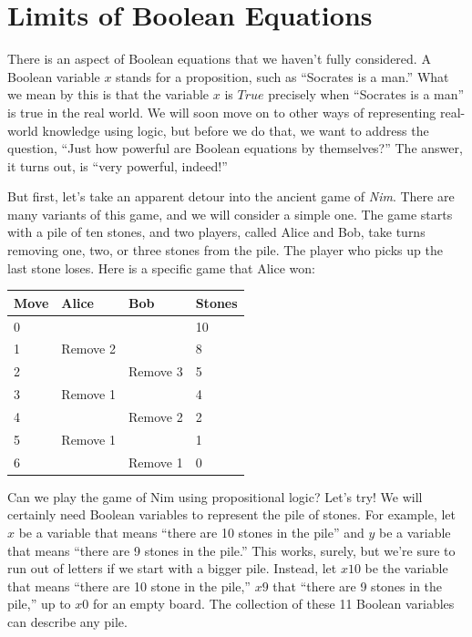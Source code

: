 {{\section{Limits of Boolean Equations}

There is an aspect of Boolean equations that we haven't fully considered. A Boolean variable $x$ stands for a proposition, 
such as ``Socrates is a man.'' What we mean by this is that the variable $x$ is $True$ precisely when ``Socrates is a man'' 
is true in the real world. We will soon move on to other ways of representing real-world knowledge using logic, but before 
we do that, we want to address the question, ``Just how powerful are Boolean equations by themselves?'' The answer, it 
turns out, is ``very powerful, indeed!''

But first, let's take an apparent detour into the ancient game of \emph{Nim}. There are many variants of this game, and we 
will consider a simple one. The game starts with a pile of ten stones, and two players, called Alice and Bob, take turns 
removing one, two, or three stones from the pile. The player who picks up the last stone loses. Here is a specific game 
that Alice won:

\begin{flushleft}
\begin{tabular}{l|l|l|l}
Move & Alice     & Bob      & Stones \\
\hline
0    &           &          & 10     \\
1    & Remove 2  &          & 8      \\
2    &           & Remove 3 & 5      \\
3    & Remove 1  &          & 4      \\
4    &           & Remove 2 & 2      \\
5    & Remove 1  &          & 1      \\
6    &           & Remove 1 & 0      \\
\end{tabular}
\end{flushleft}

Can we play the game of Nim using propositional logic? Let's try! We will certainly need Boolean variables to represent the 
pile of stones. For example, let $x$ be a variable that means ``there are 10 stones in the pile'' and $y$ be a variable that 
means ``there are 9 stones in the pile.'' This works, surely, but we're sure to run out of letters if we start with a bigger
pile. Instead, let $x10$ be the variable that means ``there are 10 stone in the pile,'' $x9$ that ``there are 9 stones in 
the pile,'' up to $x0$ for an empty board. The collection of these 11 Boolean variables can describe any pile.

}}
